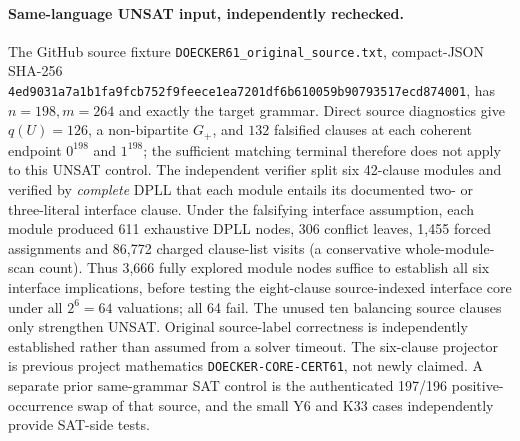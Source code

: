 \documentclass[11pt]{article}
\begin{document}
\paragraph{Same-language UNSAT input, independently rechecked.} The GitHub source fixture \texttt{DOECKER61\_original\_source.txt}, compact-JSON SHA-256 \texttt{4ed9031a7a1b1fa9fcb752f9feece1ea7201df6b610059b90793517ecd874001}, has $n=198,m=264$ and exactly the target grammar. Direct source diagnostics give $q(U)=126$, a non-bipartite $G_+$, and $132$ falsified clauses at each coherent endpoint $0^{198}$ and $1^{198}$; the sufficient matching terminal therefore does not apply to this UNSAT control. The independent verifier split six 42-clause modules and verified by \emph{complete} DPLL that each module entails its documented two- or three-literal interface clause. Under the falsifying interface assumption, each module produced 611 exhaustive DPLL nodes, 306 conflict leaves, 1,455 forced assignments and 86,772 charged clause-list visits (a conservative whole-module-scan count). Thus 3,666 fully explored module nodes suffice to establish all six interface implications, before testing the eight-clause source-indexed interface core under all $2^6=64$ valuations; all 64 fail. The unused ten balancing source clauses only strengthen UNSAT. Original source-label correctness is independently established rather than assumed from a solver timeout. The six-clause projector is previous project mathematics \texttt{DOECKER-CORE-CERT61}, not newly claimed. A separate prior same-grammar SAT control is the authenticated 197/196 positive-occurrence swap of that source, and the small Y6 and K33 cases independently provide SAT-side tests.
\end{document}
